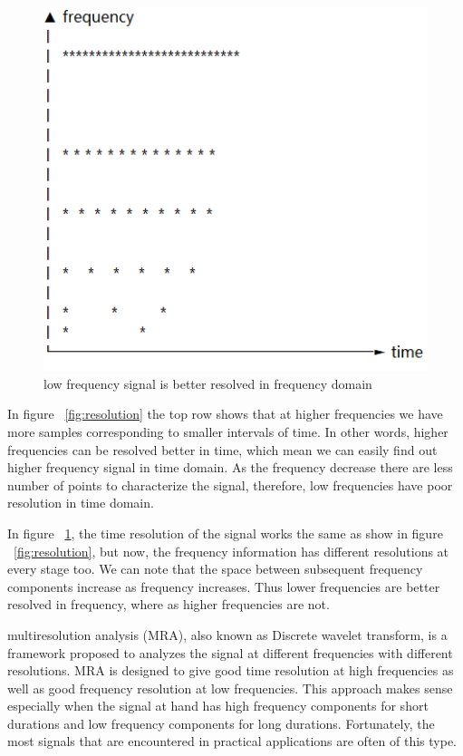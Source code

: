 \begin{figure}[h]
\centering
\includegraphics[width=1\textwidth]{images/resolution_blank2.PNG}
\caption{low frequency signal is better resolved in frequency domain}
\label{fig:resolution_frequency}
\end{figure}

In figure ~\ref{fig:resolution} the top row shows that at higher frequencies we have more samples corresponding to smaller intervals of time. In other words, higher frequencies can be resolved better in time, which mean we can easily find out higher frequency signal in time domain. As the frequency decrease there are less number of points to characterize the signal, therefore, low frequencies have poor resolution in time domain. 

In figure ~\ref{fig:resolution_frequency}, the time resolution of the signal works the same as show in figure ~\ref{fig:resolution}, but now, the frequency information has different resolutions at every stage too. We can note that the space between subsequent frequency components increase as frequency increases. Thus lower frequencies are better resolved in frequency, where as higher frequencies are not.

multiresolution analysis (MRA), also known as Discrete wavelet transform, is a framework proposed to analyzes the signal at different frequencies with different resolutions. MRA is designed to give good time resolution at high frequencies as well as good frequency resolution at low frequencies. This approach makes sense especially when the signal at hand has high frequency components for short durations and low frequency components for long durations. Fortunately, the most signals that are encountered in practical applications are often of this type.

